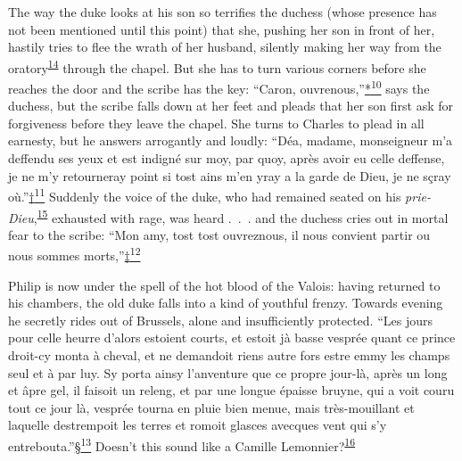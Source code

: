 The way the duke looks at his son so terrifies the duchess (whose
presence has not been mentioned until this point) that she, pushing her
son in front of her, hastily tries to flee the wrath of her husband,
silently making her way from the
oratory\textsuperscript{\protect\hypertarget{21_Chapter_Thirteen__IMAGE_AND_WORD.xhtmlux5cux23id_281}{\protect\hyperlink{23_NOTES.xhtmlux5cux23id_282}{14}}}
through the chapel. But she has to turn various corners before she
reaches the door and
\protect\hypertarget{21_Chapter_Thirteen__IMAGE_AND_WORD.xhtmlux5cux23page_345}{}{}the
scribe has the key: ``Caron,
ouvrenous,''\protect\hypertarget{21_Chapter_Thirteen__IMAGE_AND_WORD.xhtmlux5cux23id_2713}{\protect\hyperlink{23_NOTES.xhtmlux5cux23id_2714}{*\textsuperscript{10}}}
says the duchess, but the scribe falls down at her feet and pleads that
her son first ask for forgiveness before they leave the chapel. She
turns to Charles to plead in all earnesty, but he answers arrogantly and
loudly: ``Déa, madame, monseigneur m'a deffendu ses yeux et est indigné
sur moy, par quoy, après avoir eu celle deffense, je ne m'y retourneray
point si tost ains m'en yray a la garde de Dieu, je ne sçray
où.''\protect\hypertarget{21_Chapter_Thirteen__IMAGE_AND_WORD.xhtmlux5cux23id_2715}{\protect\hyperlink{23_NOTES.xhtmlux5cux23id_2716}{†\textsuperscript{11}}}
Suddenly the voice of the duke, who had remained seated on his
\emph{prie-Dieu},\textsuperscript{\protect\hypertarget{21_Chapter_Thirteen__IMAGE_AND_WORD.xhtmlux5cux23id_279}{\protect\hyperlink{23_NOTES.xhtmlux5cux23id_280}{15}}}
exhausted with rage, was heard .~.~. and the duchess cries out in mortal
fear to the scribe: ``Mon amy, tost tost ouvreznous, il nous convient
partir ou nous sommes
morts,''\protect\hypertarget{21_Chapter_Thirteen__IMAGE_AND_WORD.xhtmlux5cux23id_2717}{\protect\hyperlink{23_NOTES.xhtmlux5cux23id_2718}{‡\textsuperscript{12}}}

Philip is now under the spell of the hot blood of the Valois: having
returned to his chambers, the old duke falls into a kind of youthful
frenzy. Towards evening he secretly rides out of Brussels, alone and
insufficiently protected. ``Les jours pour celle heurre d'alors estoient
courts, et estoit jà basse vesprée quant ce prince droit-cy monta à
cheval, et ne demandoit riens autre fors estre emmy les champs seul et à
par luy. Sy porta ainsy l'anventure que ce propre jour-là, après un long
et âpre gel, il faisoit un releng, et par une longue épaisse bruyne, qui
a voit couru tout ce jour là, vesprée tourna en pluie bien menue, mais
très-mouillant et laquelle destrempoit les terres et romoit glasces
avecques vent qui s'y
entrebouta.''\protect\hypertarget{21_Chapter_Thirteen__IMAGE_AND_WORD.xhtmlux5cux23id_2719}{\protect\hyperlink{23_NOTES.xhtmlux5cux23id_2720}{§\textsuperscript{13}}}
Doesn't this sound like a Camille
Lemonnier?\textsuperscript{\protect\hypertarget{21_Chapter_Thirteen__IMAGE_AND_WORD.xhtmlux5cux23id_277}{\protect\hyperlink{23_NOTES.xhtmlux5cux23id_278}{16}}}

